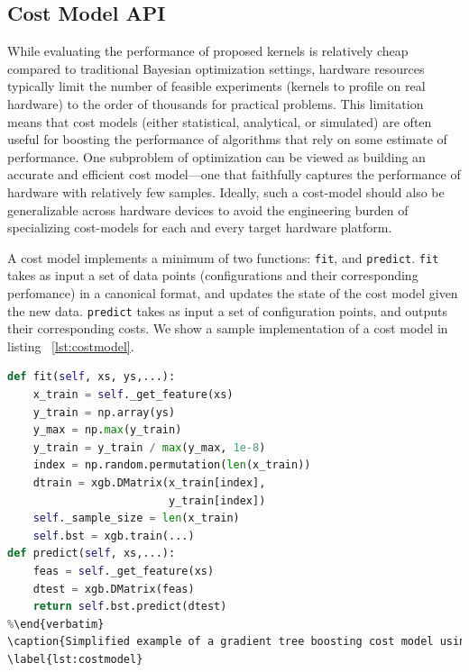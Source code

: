 \subsection{Cost Model API}
While evaluating the performance of proposed kernels is relatively cheap compared to traditional Bayesian optimization settings, hardware resources typically limit the number of feasible experiments (kernels to profile on real hardware) to the order of thousands for practical problems.
This limitation means that cost models (either statistical, analytical, or simulated) are often useful for boosting the performance of algorithms that rely on some estimate of performance.
One subproblem of optimization can be viewed as building an accurate and efficient cost model---one that faithfully captures the performance of hardware with relatively few samples.
Ideally, such a cost-model should also be generalizable across hardware devices to avoid the engineering burden of specializing cost-models for each and every target hardware platform.

A cost model implements a minimum of two functions: \texttt{fit}, and \texttt{predict}.
\texttt{fit} takes as input a set of data points (configurations and their corresponding perfomance) in a canonical format, and updates the state of the cost model given the new data.
\texttt{predict} takes as input a set of configuration points, and outputs their corresponding costs.
We show a sample implementation of a cost model in listing ~\autoref{lst:costmodel}.

\begin{lstlisting}[language=Python]
def fit(self, xs, ys,...):
    x_train = self._get_feature(xs)
    y_train = np.array(ys)
    y_max = np.max(y_train)
    y_train = y_train / max(y_max, 1e-8)
    index = np.random.permutation(len(x_train))
    dtrain = xgb.DMatrix(x_train[index],
                         y_train[index])
    self._sample_size = len(x_train)
    self.bst = xgb.train(...)
def predict(self, xs,...):
    feas = self._get_feature(xs)
    dtest = xgb.DMatrix(feas)
    return self.bst.predict(dtest)
%\end{verbatim}
\caption{Simplified example of a gradient tree boosting cost model using the XGBoost~\cite{chen2016xgboost} library. \texttt{\_get\_feature} can be any function that presents an arbitrary feature representation to the cost model. For example, this representation may simply be a concatenation of the choices, an AST representation of the lowered code, or a dataflow graph of operations.}
\label{lst:costmodel}
\end{lstlisting}



